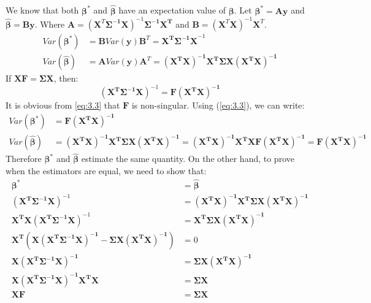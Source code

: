 \documentclass[11pt]{scrartcl} %
\begin{document}
	\subsection{} %
		We know that both $\boldsymbol{\beta}^*$ and $\boldsymbol{\hat{\beta}}$ have an expectation value of $\boldsymbol{\beta}$.
		Let $\boldsymbol{\beta}^* = \boldsymbol{Ay}$ and $\boldsymbol{\hat{\beta}}= \boldsymbol{By}$.
		Where $\boldsymbol{A} = (\boldsymbol{X}^T\boldsymbol{\Sigma^{-1}X})^{-1}\boldsymbol{\Sigma^{-1}X^T}$ 
		and $\boldsymbol{B} = (\boldsymbol{X}^T\boldsymbol{X})^{-1}\boldsymbol{X}^T$.
		\begin{equation}
			\begin{aligned}
				Var(\boldsymbol{\beta}^*) &=  \boldsymbol{B}Var(\boldsymbol{y})\boldsymbol{B}^T = \boldsymbol{X^T \Sigma^{-1} X}^{-1}\\
				Var(\boldsymbol{\hat{\beta}}) &= \boldsymbol{A}Var(\boldsymbol{y})\boldsymbol{A}^T =
				\boldsymbol{(X^T X)^{-1} X^T \Sigma X (X^T X)^{-1}}
			\end{aligned}
		\end{equation}
		If $\boldsymbol{XF}=\boldsymbol{\Sigma X}$, then:
		\begin{equation} \label{eq:3.3}
		 (\boldsymbol{X^T \Sigma^{-1} X})^{-1} = \boldsymbol{F(X^T X)^{-1}}
		\end{equation}
		It is obvious from \ref{eq:3.3} that $\boldsymbol{F}$ is non-singular. Using (\ref{eq:3.3}), we can write:
		\begin{equation}
			\begin{aligned}
				Var(\boldsymbol{\beta}^*) & = \boldsymbol{F(X^T X)^{-1}} \\
				Var(\boldsymbol{\hat{\beta}}) & =
				\boldsymbol{(X^T X)^{-1} X^T \Sigma X (X^T X)^{-1}} =
				\boldsymbol{(X^T X)^{-1} X^T X F (X^T X)^{-1}} = 
				\boldsymbol{F(X^T X)^{-1}}
			\end{aligned}
		\end{equation}
		Therefore $\boldsymbol{\beta}^*$ and $\boldsymbol{\hat{\beta}}$ estimate the same quantity.
		On the other hand, to prove when the estimators are equal, we need to show that:
		\begin{equation}
			\begin{aligned}
				\boldsymbol{\beta}^* &= \boldsymbol{\hat{\beta}} \\
				(\boldsymbol{X^T \Sigma^{-1} X})^{-1} &= \boldsymbol{(X^T X)^{-1} X^T \Sigma X (X^T X)^{-1}} \\
				\boldsymbol{X^T X}(\boldsymbol{X^T \Sigma^{-1} X})^{-1} &= \boldsymbol{X^T \Sigma X (X^T X)^{-1}} \\
				\boldsymbol{X^T} \left(\boldsymbol{X}\boldsymbol{(X^T \Sigma^{-1} X)^{-1} - \Sigma X (X^T X)^{-1}}\right)&=0\\
				\boldsymbol{X}\boldsymbol{(X^T \Sigma^{-1} X)^{-1}} &= \boldsymbol{\Sigma X (X^T X)^{-1}}\\
				\boldsymbol{X}\boldsymbol{(X^T \Sigma^{-1} X)^{-1} X^T X} &= \boldsymbol{\Sigma X}\\
				\boldsymbol{XF} &= \boldsymbol{\Sigma X} 
			\end{aligned}
		\end{equation}
\end{document}
